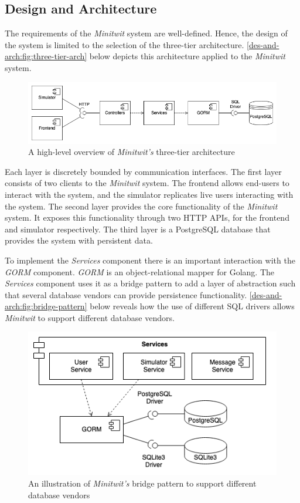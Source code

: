\subsection{Design and Architecture}
\label{sec:design_arch}

The requirements of the \textit{Minitwit} system are well-defined. Hence, the design of the system is limited to the selection of the three-tier architecture.
\autoref{des-and-arch:fig:three-tier-arch} below depicts this architecture applied to the \textit{Minitwit} system.

\begin{figure}[H]
    \centering
    \includegraphics[width=\textwidth]{images/DevOpsArch.png}
    \caption{A high-level overview of \textit{Minitwit's} three-tier architecture}
    \label{des-and-arch:fig:three-tier-arch}
\end{figure}

Each layer is discretely bounded by communication interfaces.
The first layer consists of two clients to the \textit{Minitwit} system.
The frontend allows end-users to interact with the system, and the simulator replicates live users interacting with the system.
The second layer provides the core functionality of the \textit{Minitwit} system.
It exposes this functionality through two HTTP APIs, for the frontend and simulator respectively.
The third layer is a PostgreSQL database that provides the system with persistent data.

To implement the \textit{Services} component there is an important interaction with the \textit{GORM} component. \textit{GORM} is an object-relational mapper for Golang. The \textit{Services} component uses it as a bridge pattern to add a layer of abstraction such that several database vendors can provide persistence functionality.
\autoref{des-and-arch:fig:bridge-pattern} below reveals how the use of different SQL drivers allows \textit{Minitwit} to support different database vendors.

\begin{figure}[H]
    \centering
    \includegraphics[scale=0.65]{images/DevOpsBridge.png}
    \caption{An illustration of \textit{Minitwit's} bridge pattern to support different database vendors}
    \label{des-and-arch:fig:bridge-pattern}
\end{figure}

